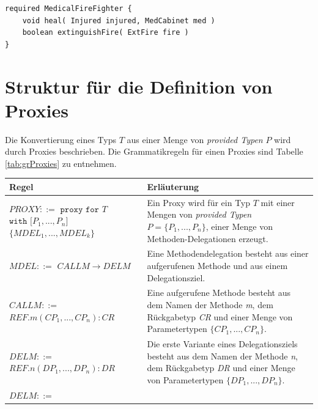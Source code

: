 \documentclass[a4paper,12pt]{article}
\begin{document}
\begin{lstlisting}[caption={Bibliothek \emph{ExampLe} von Typen},captionpos=b, style = dsl]
required MedicalFireFighter {
	void heal( Injured injured, MedCabinet med )
	boolean extinguishFire( ExtFire fire )	
}
\end{lstlisting}\label{lst:libEx}

\newpage

\section{Struktur für die Definition von Proxies}\label{sec:proxygram}
Die Konvertierung eines Typs $T$ aus einer Menge von \emph{provided Typen} $P$ wird durch Proxies beschrieben. Die Grammatikregeln für einen Proxies sind Tabelle \ref{tab:grProxies} zu entnehmen.
\begin{table}[H]
\centering
\begin{tabular}{|p{5cm}|p{9cm}|}
\hline
\hline
\centering\textbf{Regel} & \textbf{Erläuterung} \\
\hline
\hline
$\mathit{PROXY} ::=$\newline
$\texttt{proxy } \texttt{for } T$\newline
$ \texttt{with [}\mathit{P_1},...,\mathit{P_n}\texttt{]}$ \newline
$\texttt{\{}\mathit{MDEL_1},...,\mathit{MDEL_k} \texttt{\}}$
 & Ein Proxy wird für ein Typ $T$ mit einer Mengen von \emph{provided Typen} $P = \{P_1,...,P_n\}$, einer Menge von Methoden-Delegationen erzeugt.\\
\hline
$\mathit{MDEL} ::=$\newline
$CALLM \rightarrow DELM $  & Eine Methodendelegation besteht aus einer aufgerufenen Methode und aus einem Delegationsziel.\\
\hline
$\mathit{CALLM} ::=$\newline 
$\mathit{REF}.\mathit{m(\mathit{CP_1},...,\mathit{CP_n}):CR} $  & Eine aufgerufene Methode besteht aus dem Namen der Methode \emph{m}, dem Rückgabetyp \emph{CR} und einer Menge von Parametertypen $\{\mathit{CP_1},...,\mathit{CP_n}\}$.\\
\hline
$\mathit{DELM} ::=$\newline 
$\mathit{REF}.\mathit{n(\mathit{DP_1},...,\mathit{DP_n}):DR} $  
& Die erste Variante eines Delegationsziels besteht aus  dem Namen der Methode \emph{n}, dem Rückgabetyp \emph{DR} und einer Menge von Parametertypen $\{\mathit{DP_1},...,\mathit{DP_n}\}$.\\
\hline
$\mathit{DELM} ::=$\newline

\end{tabular}
\end{table}
\end{document}

